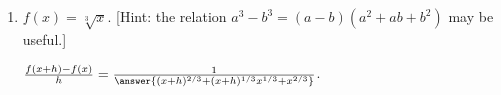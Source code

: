 \documentclass{ximera}
\begin{document}
\begin{exercise}
\begin{enumerate}
\item $f(x)= \sqrt[3]{x}$. [Hint: the relation $a^3-b^3 = (a-b)(a^2+ab+b^2)$ may be useful.]

$\frac{f(x+h)-f(x)}{h} = \frac{1}{\answer{(x+h)^{2/3}+(x+h)^{1/3}x^{1/3} + x^{2/3}}}$.  
	
\end{enumerate}
\end{exercise}
\end{document}
